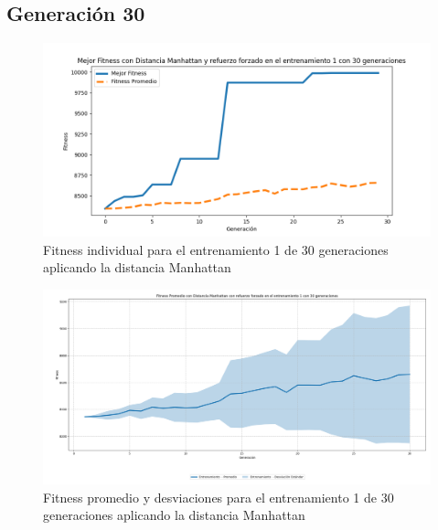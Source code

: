 \documentclass[conference]{IEEEtran}
\begin{document}

\subsection{Generación 30}
\setcounter{figure}{0}
\renewcommand{\thefigure}{S\arabic{figure}B-M}

\begin{figure}[H]
    \centering
    \includegraphics[width=0.9 \linewidth]{Manhattan/Fitness_individual_30Gen/Fitness_1_Mahn_30Gen.png}
    \caption{Fitness individual para el entrenamiento 1 de 30 generaciones aplicando la distancia Manhattan}
    \label{fig:manhattan_1_30}
\end{figure}
\begin{figure}[H]
    \centering
    \includegraphics[width=0.9 \linewidth]{Manhattan/Fitness_individual_30Gen/Fitness_1_Mahn_30Gen_Sombra.png}
    \caption{Fitness promedio y desviaciones para el entrenamiento 1 de 30 generaciones aplicando la distancia Manhattan}
    \label{fig:manhattan_1_30_sombra}
\end{figure}
\end{document}
